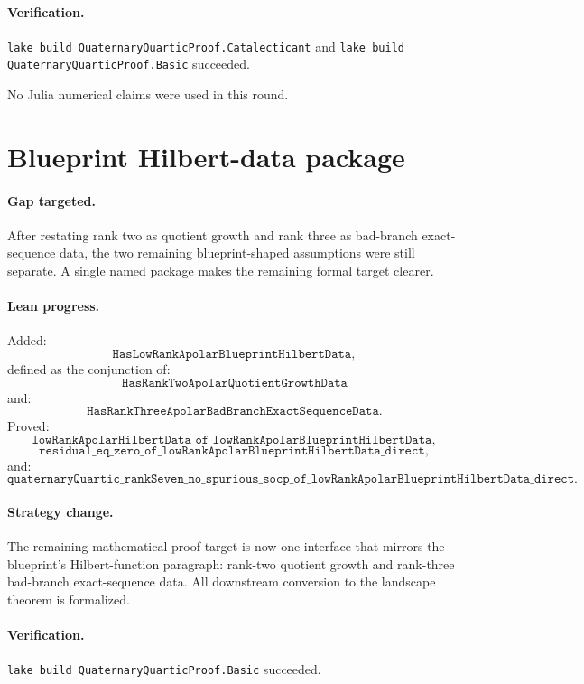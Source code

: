 \documentclass[11pt]{article}
\begin{document}
\paragraph{Verification.}
\texttt{lake build QuaternaryQuarticProof.Catalecticant} and
\texttt{lake build QuaternaryQuarticProof.Basic} succeeded.

No Julia numerical claims were used in this round.

\section*{Blueprint Hilbert-data package}

\paragraph{Gap targeted.}
After restating rank two as quotient growth and rank three as bad-branch
exact-sequence data, the two remaining blueprint-shaped assumptions were still
separate.  A single named package makes the remaining formal target clearer.

\paragraph{Lean progress.}
Added:
\[
\texttt{HasLowRankApolarBlueprintHilbertData},
\]
defined as the conjunction of:
\[
\texttt{HasRankTwoApolarQuotientGrowthData}
\]
and:
\[
\texttt{HasRankThreeApolarBadBranchExactSequenceData}.
\]
Proved:
\[
\texttt{lowRankApolarHilbertData\_of\_lowRankApolarBlueprintHilbertData},
\]
\[
\texttt{residual\_eq\_zero\_of\_lowRankApolarBlueprintHilbertData\_direct},
\]
and:
\[
\texttt{quaternaryQuartic\_rankSeven\_no\_spurious\_socp\_of\_lowRankApolarBlueprintHilbertData\_direct}.
\]

\paragraph{Strategy change.}
The remaining mathematical proof target is now one interface that mirrors the
blueprint's Hilbert-function paragraph: rank-two quotient growth and rank-three
bad-branch exact-sequence data.  All downstream conversion to the landscape
theorem is formalized.

\paragraph{Verification.}
\texttt{lake build QuaternaryQuarticProof.Basic} succeeded.
\end{document}
